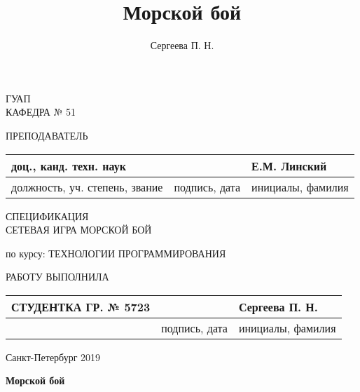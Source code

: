 \documentclass[a4paper,14pt]{extarticle} %
\author{Сергеева П. Н.}
\title{Морской бой}
\begin{document}
\begin{titlepage}
\begin{center}

ГУАП\\
КАФЕДРА № 51\\
\vspace{2cm}

\begin{flushleft}
ПРЕПОДАВАТЕЛЬ
\begin{tabular}{|l|l|l|}
\hline
доц., канд. техн. наук & & Е.М. Линский\\
\hline
должность, уч. степень, звание & подпись, дата & инициалы, фамилия\\
\hline
\end{tabular}
\end{flushleft}

\vspace{3cm}

{\Large СПЕЦИФИКАЦИЯ\\}
\vspace{0.3cm}
{\Large СЕТЕВАЯ ИГРА МОРСКОЙ БОЙ}

\vspace{0.7cm}

\begin{flushleft}
по курсу: ТЕХНОЛОГИИ ПРОГРАММИРОВАНИЯ
\end{flushleft}

\vspace{5cm}

\begin{flushleft}
РАБОТУ ВЫПОЛНИЛА
\begin{tabular}{|l|l|l|}
\hline
СТУДЕНТКА ГР. № 5723 & & Сергеева П. Н.\\
\hline
& подпись, дата & инициалы, фамилия\\
\hline
\end{tabular}
\end{flushleft}

\vspace{2cm}

Санкт-Петербург 2019

\end{center}
\end{titlepage}
\renewcommand{\chaptername}{Раздел}
\renewcommand{\figurename}{Рисунок}

\begin{center}
\huge \bf Морской бой
\end{center}

\setcounter{page}{2}
\end{document}
